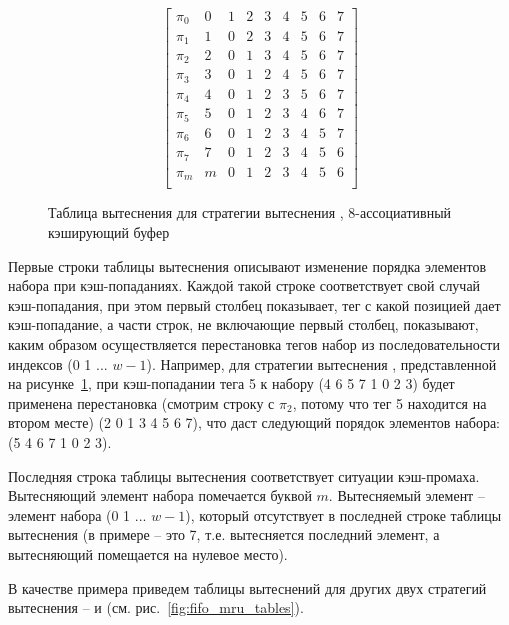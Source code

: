 \begin{figure}[h]
$$ \left[
     \begin{array}{c|cccccccc}
       \pi_0 & 0 & 1 & 2 & 3 & 4 & 5 & 6 & 7 \\
       \pi_1 & 1 & 0 & 2 & 3 & 4 & 5 & 6 & 7 \\
       \pi_2 & 2 & 0 & 1 & 3 & 4 & 5 & 6 & 7 \\
       \pi_3 & 3 & 0 & 1 & 2 & 4 & 5 & 6 & 7 \\
       \pi_4 & 4 & 0 & 1 & 2 & 3 & 5 & 6 & 7 \\
       \pi_5 & 5 & 0 & 1 & 2 & 3 & 4 & 6 & 7 \\
       \pi_6 & 6 & 0 & 1 & 2 & 3 & 4 & 5 & 7 \\
       \pi_7 & 7 & 0 & 1 & 2 & 3 & 4 & 5 & 6 \\
       \pi_m & m & 0 & 1 & 2 & 3 & 4 & 5 & 6 \\
     \end{array}
   \right]
$$
\caption{Таблица вытеснения для стратегии вытеснения \LRU,
8-ассоциативный кэширующий буфер}\label{PolicyTableLRU8}
\end{figure}

Первые строки таблицы вытеснения описывают изменение порядка
элементов набора при кэш-попаданиях. Каждой такой строке
соответствует свой случай кэш-попадания, при этом первый столбец
показывает, тег с какой позицией дает кэш-попадание, а части строк,
не включающие первый столбец, показывают, каким образом
осуществляется перестановка тегов набор из последовательности
индексов (0 1 ... $w{-}1$). Например, для стратегии вытеснения \LRU,
представленной на рисунке~\ref{PolicyTableLRU8}, при кэш-попадании
тега 5 к набору (4 6 5 7 1 0 2 3) будет применена перестановка
(смотрим строку с $\pi_2$, потому что тег 5 находится на втором
месте) (2 0 1 3 4 5 6 7), что даст следующий порядок элементов
набора: (5 4 6 7 1 0 2 3).

Последняя строка таблицы вытеснения соответствует ситуации
кэш-промаха. Вытесняющий элемент набора помечается буквой $m$.
Вытесняемый элемент -- элемент набора (0 1 ... $w{-}1$), который
отсутствует в последней строке таблицы вытеснения (в примере -- это
7, т.е. вытесняется последний элемент, а вытесняющий помещается на
нулевое место).

В качестве примера приведем таблицы вытеснений для других двух
стратегий вытеснения -- \FIFO и \MRU (см.
рис.~\ref{fig:fifo_mru_tables}).

